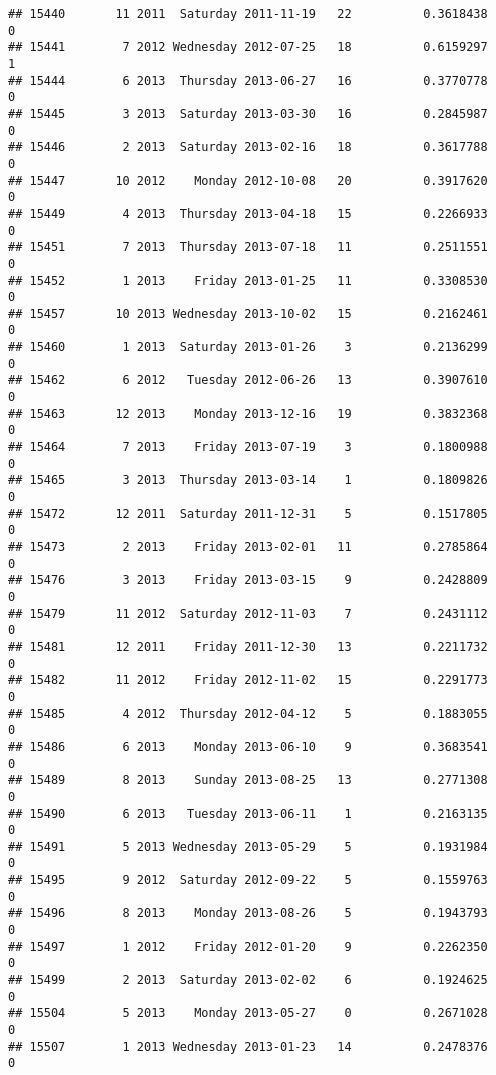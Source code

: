 \documentclass[
]{article}
\begin{document}
\begin{verbatim}
## 15440       11 2011  Saturday 2011-11-19   22          0.3618438             0
## 15441        7 2012 Wednesday 2012-07-25   18          0.6159297             1
## 15444        6 2013  Thursday 2013-06-27   16          0.3770778             0
## 15445        3 2013  Saturday 2013-03-30   16          0.2845987             0
## 15446        2 2013  Saturday 2013-02-16   18          0.3617788             0
## 15447       10 2012    Monday 2012-10-08   20          0.3917620             0
## 15449        4 2013  Thursday 2013-04-18   15          0.2266933             0
## 15451        7 2013  Thursday 2013-07-18   11          0.2511551             0
## 15452        1 2013    Friday 2013-01-25   11          0.3308530             0
## 15457       10 2013 Wednesday 2013-10-02   15          0.2162461             0
## 15460        1 2013  Saturday 2013-01-26    3          0.2136299             0
## 15462        6 2012   Tuesday 2012-06-26   13          0.3907610             0
## 15463       12 2013    Monday 2013-12-16   19          0.3832368             0
## 15464        7 2013    Friday 2013-07-19    3          0.1800988             0
## 15465        3 2013  Thursday 2013-03-14    1          0.1809826             0
## 15472       12 2011  Saturday 2011-12-31    5          0.1517805             0
## 15473        2 2013    Friday 2013-02-01   11          0.2785864             0
## 15476        3 2013    Friday 2013-03-15    9          0.2428809             0
## 15479       11 2012  Saturday 2012-11-03    7          0.2431112             0
## 15481       12 2011    Friday 2011-12-30   13          0.2211732             0
## 15482       11 2012    Friday 2012-11-02   15          0.2291773             0
## 15485        4 2012  Thursday 2012-04-12    5          0.1883055             0
## 15486        6 2013    Monday 2013-06-10    9          0.3683541             0
## 15489        8 2013    Sunday 2013-08-25   13          0.2771308             0
## 15490        6 2013   Tuesday 2013-06-11    1          0.2163135             0
## 15491        5 2013 Wednesday 2013-05-29    5          0.1931984             0
## 15495        9 2012  Saturday 2012-09-22    5          0.1559763             0
## 15496        8 2013    Monday 2013-08-26    5          0.1943793             0
## 15497        1 2012    Friday 2012-01-20    9          0.2262350             0
## 15499        2 2013  Saturday 2013-02-02    6          0.1924625             0
## 15504        5 2013    Monday 2013-05-27    0          0.2671028             0
## 15507        1 2013 Wednesday 2013-01-23   14          0.2478376             0

\end{verbatim}
\end{document}
